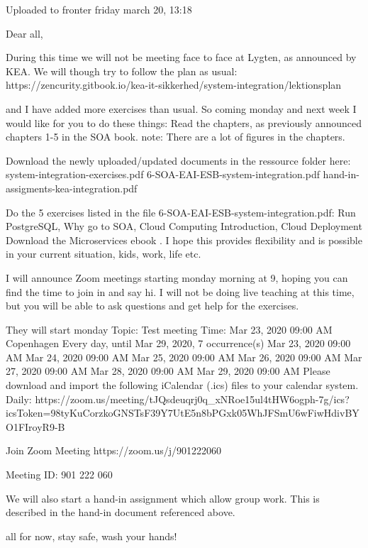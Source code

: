 \documentclass[a4paper,11pt,notitlepage]{report}
\begin{document}
Uploaded to fronter friday march 20, 13:18

Dear all,

During this time we will not be meeting face to face at Lygten, as announced by KEA. We will though try to follow the plan as usual:
https://zencurity.gitbook.io/kea-it-sikkerhed/system-integration/lektionsplan

and I have added more exercises than usual. So coming monday and next week I would like for you to do these things:
Read the chapters, as previously announced chapters 1-5 in the SOA book. note: There are a lot of figures in the chapters.

Download the newly uploaded/updated documents in the ressource folder here:
system-integration-exercises.pdf
6-SOA-EAI-ESB-system-integration.pdf
hand-in-assigments-kea-integration.pdf

Do the 5 exercises listed in the file 6-SOA-EAI-ESB-system-integration.pdf: Run PostgreSQL, Why go to SOA, Cloud Computing Introduction, Cloud Deployment
Download the Microservices ebook . I hope this provides flexibility and is possible in your current situation, kids, work, life etc.

I will announce Zoom meetings starting monday morning at 9, hoping you can find the time to join in and say hi. I will not be doing live teaching at this time, but you will be able to ask questions and get help for the exercises.

They will start monday
Topic: Test meeting
Time: Mar 23, 2020 09:00 AM Copenhagen
        Every day, until Mar 29, 2020, 7 occurrence(s)
        Mar 23, 2020 09:00 AM
        Mar 24, 2020 09:00 AM
        Mar 25, 2020 09:00 AM
        Mar 26, 2020 09:00 AM
        Mar 27, 2020 09:00 AM
        Mar 28, 2020 09:00 AM
        Mar 29, 2020 09:00 AM
Please download and import the following iCalendar (.ics) files to your calendar system.
Daily: https://zoom.us/meeting/tJQsdeuqrj0q_xNRoe15ul4tHW6ogph-7g/ics?icsToken=98tyKuCorzkoGNSTsF39Y7UtE5n8bPGxk05WhJFSmU6wFiwHdivBYO1FIroyR9-B

Join Zoom Meeting
https://zoom.us/j/901222060

Meeting ID: 901 222 060

We will also start a hand-in assignment which allow group work. This is described in the hand-in document referenced above.

all for now, stay safe, wash your hands!
\end{document}
